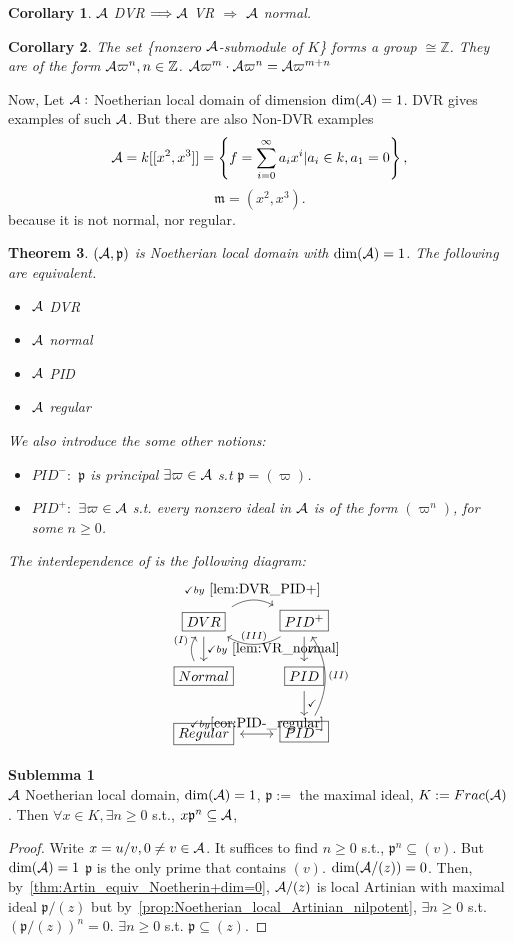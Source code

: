 \documentclass[11pt]{article}
\newtheorem{thm}{Theorem}[section]
\newtheorem{cor}[thm]{Corollary}
\newcommand{\intg}{\mathbb Z}
\newcommand{\scm}{{\mathfrak m}}
\newcommand{\scp}{{\mathfrak p}}
\newcommand{\cala}{{\cal A}}
\newcommand{\Lrta}{\Longrightarrow}
\begin{document}
\begin{cor}
$\cala$ DVR $\Lrta \cala$ VR $\Lrta $ $\cala$ normal.
\end{cor}

\begin{cor}
The set \{nonzero $\cala$-submodule of $K$\} forms a group $\cong \intg$. They are of the form $\cala\varpi^n, n\in \intg$. $\cala\varpi^m\cdot \cala\varpi^n=\cala\varpi^{m+n}$
\end{cor}

Now, Let $\cala:$ Noetherian local domain of dimension $\text{dim}(\cala)=1$. DVR gives examples of such $\cala$. But there are also Non-DVR examples
$$
\cala=k[[x^2,x^3]]=\left\{f=\sum^{\infty}_{i=0}a_i x^i|a_i\in k, a_1=0\right\},
$$
$$
\scm=(x^2,x^3).
$$
because it is  not normal, nor regular.
\begin{thm} $(\cala,\scp)$ is Noetherian local domain with $\text{dim}(\cala)=1$.  
The following are equivalent.
\begin{itemize}
\item $\cala$ DVR
\item $\cala$ normal
\item $\cala$ PID
\item $\cala$ regular
\end{itemize}

We also introduce the some other notions:
\begin{itemize}
\item $PID^-:$ $\scp$ is principal $\exists \varpi\in \cala$ s.t $\scp=(\varpi)$.
\item
 $PID^{+}:$ $\exists \varpi \in\cala$ s.t. every nonzero ideal in $\cala$ is of the form $(\varpi^n)$, for some $n\geq 0$.
\end{itemize}
The interdependence of is the following diagram:
\[
\begin{tikzcd}
\boxed{DVR} \arrow[d, "\checkmark by~\ref{lem:VR_normal}"] \arrow[r, "\checkmark by~\ref{lem:DVR_PID+}", bend left] & \boxed{PID^+} \arrow[l, "(III)"', bend left] \arrow[d, "\checkmark"] \\
\boxed{Normal} \arrow[u, "(I)", bend left] & \boxed{PID} \arrow[d, "\checkmark"] \\
\boxed{Regular} \arrow[r, leftrightarrow, "\checkmark by \ref{cor:PID-_regular}"] & \boxed{PID^-} \arrow[uu, "(II)"', bend right]
\end{tikzcd}
\]
\end{thm}

\textbf{Sublemma 1}\\
$\cala$ Noetherian local domain, $\text{dim}(\cala)=1$, $\scp:=$ the maximal ideal, $K:=Frac(\cala)$.
Then $\forall x\in K,\exists n\geq 0$ s.t., $x\scp^n\subseteq \cala$,
\begin{proof}
Write $x=u/v, 0\neq v\in \cala$. It suffices to find $n\geq 0$ s.t., $\scp^n\subseteq(v)$. But $\text{dim}(\cala)=1$ $\scp$ is the only prime that contains $(v)$. $\text{dim}(\cala/(z))=0$. Then, by~\ref{thm:Artin_equiv_Noetherin+dim=0},  $\cala/(z)$ is local Artinian with maximal ideal $\scp/(z)$ but by~\ref{prop:Noetherian_local_Artinian_nilpotent}, $\exists n\geq 0$ s.t. $(\scp/(z))^n=0$. $\exists n\geq 0$ s.t. $\scp\subseteq(z)$.
\end{proof}
\end{document}
